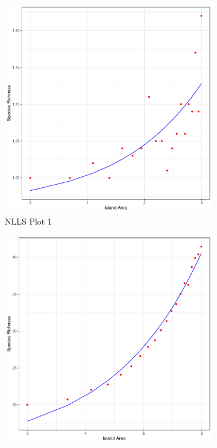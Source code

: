 \documentclass{article}
\begin{document}
\begin{figure}[h!]
  \centering
  \begin{subfigure}[b]{0.3\linewidth}
    \includegraphics[width=\linewidth]{../../../Results/Simulation2/NLLS/NLLSfits_1.pdf}
     \caption{NLLS Plot 1}
  \end{subfigure}
  \begin{subfigure}[b]{0.3\linewidth}
    \includegraphics[width=\linewidth]{../../../Results/Simulation2/NLLS/NLLSfits_200.pdf}

\end{subfigure}
\end{figure}
\end{document}
